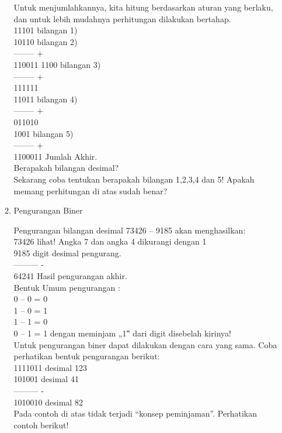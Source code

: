 \documentclass{article}
\begin{document}
\begin{enumerate}
\begin{enumerate}
Untuk menjumlahkannya, kita hitung berdasarkan aturan yang berlaku, dan untuk lebih mudahnya perhitungan dilakukan bertahap. \\
11101 bilangan 1) \\
10110 bilangan 2) \\
-------- + \\
110011
1100 bilangan 3) \\
-------- + \\
111111 \\
11011 bilangan 4) \\ 
-------- + \\
011010 \\
1001 bilangan 5) \\ 
-------- + \\
1100011 \textrightarrow Jumlah Akhir. \\
Berapakah bilangan desimal? \\
Sekarang coba tentukan berapakah bilangan 1,2,3,4 dan 5! Apakah memang perhitungan di atas sudah benar? \\

\item Pengurangan Biner

Pengurangan bilangan desimal 73426 – 9185 akan menghasilkan: \\
73426 \textrightarrow lihat! Angka 7 dan angka 4 dikurangi dengan 1 \\
9185 \textrightarrow digit desimal pengurang. \\
--------- - \\
64241 \textrightarrow Hasil pengurangan akhir. \\
Bentuk Umum pengurangan : \\
0 – 0 = 0 \\
1 – 0 = 1 \\
1 – 1 = 0 \\



0 – 1 = 1 \textrightarrow dengan meminjam „1‟ dari digit disebelah kirinya! \\ 
Untuk pengurangan biner dapat dilakukan dengan cara yang sama. Coba perhatikan bentuk pengurangan berikut: \\
1111011 \textrightarrow desimal 123 \\
101001 \textrightarrow desimal 41 \\
--------- - \\
1010010 \textrightarrow desimal 82 \\
Pada contoh di atas tidak terjadi “konsep peminjaman”. Perhatikan contoh berikut! \\






\end{enumerate}
\end{enumerate}
\end{document}
